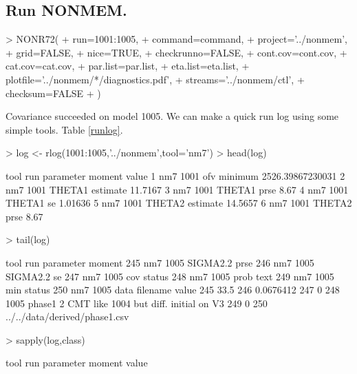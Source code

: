\subsection{Run NONMEM.}
\begin{Schunk}
\begin{Sinput}
> NONR72(
+      run=1001:1005,
+      command=command,
+      project='../nonmem',
+      grid=FALSE,
+      nice=TRUE,
+      checkrunno=FALSE,
+      cont.cov=cont.cov,
+      cat.cov=cat.cov,
+      par.list=par.list,
+      eta.list=eta.list,
+      plotfile='../nonmem/*/diagnostics.pdf',
+      streams='../nonmem/ctl',
+      checksum=FALSE
+ )
\end{Sinput}
\end{Schunk}
Covariance succeeded on model 1005.
We can make a quick run log using some simple tools. Table \ref{runlog}.
\begin{Schunk}
\begin{Sinput}
> log <- rlog(1001:1005,'../nonmem',tool='nm7')
> head(log)
\end{Sinput}
\begin{Soutput}
  tool  run parameter   moment            value
1  nm7 1001       ofv  minimum 2526.39867230031
2  nm7 1001    THETA1 estimate          11.7167
3  nm7 1001    THETA1     prse             8.67
4  nm7 1001    THETA1       se          1.01636
5  nm7 1001    THETA2 estimate          14.5657
6  nm7 1001    THETA2     prse             8.67
\end{Soutput}
\begin{Sinput}
> tail(log)
\end{Sinput}
\begin{Soutput}
    tool  run parameter   moment
245  nm7 1005  SIGMA2.2     prse
246  nm7 1005  SIGMA2.2       se
247  nm7 1005       cov   status
248  nm7 1005      prob     text
249  nm7 1005       min   status
250  nm7 1005      data filename
                                                  value
245                                                33.5
246                                           0.0676412
247                                                   0
248 1005 phase1 2 CMT like 1004 but diff. initial on V3
249                                                   0
250                       ../../data/derived/phase1.csv
\end{Soutput}
\begin{Sinput}
> sapply(log,class)
\end{Sinput}
\begin{Soutput}
       tool         run   parameter      moment       value 

\end{Soutput}
\end{Schunk}
